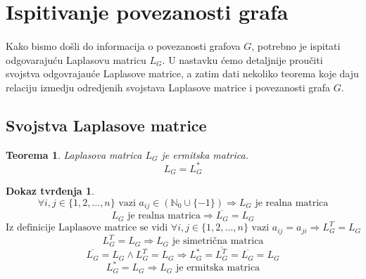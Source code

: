\documentclass[11pt]{article}
\newtheorem{theorem}{Teorema}
\newtheorem*{custom_proof}{Dokaz tvrđenja}
\begin{document}
	\section{Ispitivanje povezanosti grafa}
	\paragraph{}
	Kako bismo došli do informacija o povezanosti grafova $G$, potrebno je ispitati odgovarajuću Laplasovu matricu $L_G$. U nastavku ćemo detaljnije proučiti svojstva odgovrajauće Laplasove matrice, a zatim dati nekoliko teorema koje daju relaciju izmedju odredjenih svojstava Laplasove matrice i povezanosti grafa $G$.
	
	\subsection{Svojstva Laplasove matrice}
	
	\begin{theorem} Laplasova matrica $L_G$ je ermitska matrica.
	\[
	L_G = L_G^*
	\] 
	\end{theorem}
	
	\begin{custom_proof}
	\[
	\forall i,j \in \{1, 2, \dots, n\} \text{ vazi } a_{ij} \in (\mathbb{N}_0 \cup \{-1\}) \Rightarrow L_G \text{ je realna matrica}
	\]
	\[
	 L_G \text{ je realna matrica} \Rightarrow \overline{L_G} = L_G 
	\]
	\[
	\text{Iz definicije Laplasove matrice se vidi } \forall i,j \in \{1, 2, \dots, n\} \text{ vazi } a_{ij} = a_{ji} \Rightarrow L_G^T = L_G 
	\]
	\[
	  L_G^T = L_G \Rightarrow L_G \text{ je simetrična matrica}
	\]
	\[
	\overline{L_G} = L_G \land L_G^T = L_G \Rightarrow L_G^* = \overline{L_G^T} = \overline{L_G} = L_G 
	\]
	\[
	L_G^* = L_G \Rightarrow L_G\text{ je ermitska matrica}
	\]
	\end{custom_proof}
	
\end{document}
